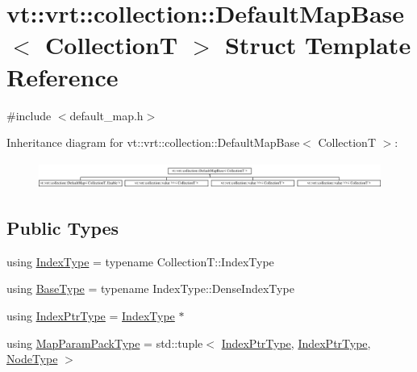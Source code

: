 \hypertarget{structvt_1_1vrt_1_1collection_1_1_default_map_base}{}\section{vt\+:\+:vrt\+:\+:collection\+:\+:Default\+Map\+Base$<$ CollectionT $>$ Struct Template Reference}
\label{structvt_1_1vrt_1_1collection_1_1_default_map_base}


{\ttfamily \#include $<$default\+\_\+map.\+h$>$}

Inheritance diagram for vt\+:\+:vrt\+:\+:collection\+:\+:Default\+Map\+Base$<$ CollectionT $>$\+:\begin{figure}[H]
\begin{center}
\leavevmode
\includegraphics[height=0.883281cm]{structvt_1_1vrt_1_1collection_1_1_default_map_base}
\end{center}
\end{figure}
\subsection*{Public Types}
\begin{DoxyCompactItemize}
\item 
using \hyperlink{structvt_1_1vrt_1_1collection_1_1_default_map_base_a88a872640fd6de6c456cb6eb9512665b}{Index\+Type} = typename Collection\+T\+::\+Index\+Type
\item 
using \hyperlink{structvt_1_1vrt_1_1collection_1_1_default_map_base_a171c2e994a586fa5d8e1213f7ebfda95}{Base\+Type} = typename Index\+Type\+::\+Dense\+Index\+Type
\item 
using \hyperlink{structvt_1_1vrt_1_1collection_1_1_default_map_base_a0a2460c532fc180c1aeb8b3b5d0df59e}{Index\+Ptr\+Type} = \hyperlink{structvt_1_1vrt_1_1collection_1_1_default_map_base_a88a872640fd6de6c456cb6eb9512665b}{Index\+Type} $\ast$
\item 
using \hyperlink{structvt_1_1vrt_1_1collection_1_1_default_map_base_a94765cd0fe916d073a01eba6eb796f8e}{Map\+Param\+Pack\+Type} = std\+::tuple$<$ \hyperlink{structvt_1_1vrt_1_1collection_1_1_default_map_base_a0a2460c532fc180c1aeb8b3b5d0df59e}{Index\+Ptr\+Type}, \hyperlink{structvt_1_1vrt_1_1collection_1_1_default_map_base_a0a2460c532fc180c1aeb8b3b5d0df59e}{Index\+Ptr\+Type}, \hyperlink{namespacevt_a866da9d0efc19c0a1ce79e9e492f47e2}{Node\+Type} $>$
\end{DoxyCompactItemize}


